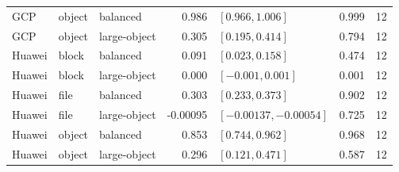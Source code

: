 \begin{tabular}{lllrlrr}
GCP & object & balanced & 0.986 & $[0.966, 1.006]$ & 0.999 & 12 \\
GCP & object & large-object & 0.305 & $[0.195, 0.414]$ & 0.794 & 12 \\
Huawei & block & balanced & 0.091 & $[0.023, 0.158]$ & 0.474 & 12 \\
Huawei & block & large-object & 0.000 & $[-0.001, 0.001]$ & 0.001 & 12 \\
Huawei & file & balanced & 0.303 & $[0.233, 0.373]$ & 0.902 & 12 \\
Huawei & file & large-object & -0.00095 & $[-0.00137, -0.00054]$ & 0.725 & 12 \\
Huawei & object & balanced & 0.853 & $[0.744, 0.962]$ & 0.968 & 12 \\
Huawei & object & large-object & 0.296 & $[0.121, 0.471]$ & 0.587 & 12 \\
\bottomrule
\end{tabular}
